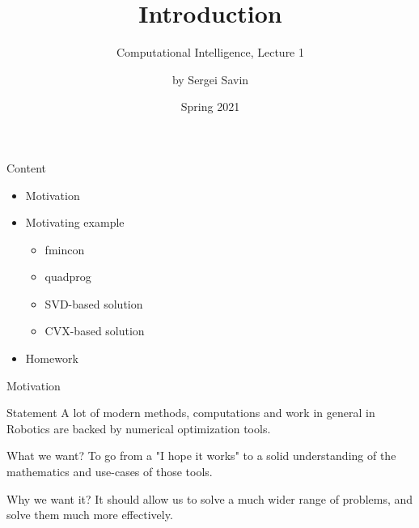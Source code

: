 \documentclass{beamer}
\title{Introduction}
\subtitle{Computational Intelligence, Lecture 1}
\author{by Sergei Savin}
\date{Spring 2021}
\begin{document}
\maketitle


\begin{frame}{Content}

\begin{itemize}
\item Motivation
\item Motivating example
\begin{itemize}
\item fmincon
\item quadprog
\item SVD-based solution
\item CVX-based solution
\end{itemize}
\item Homework
\end{itemize}

\end{frame}



\begin{frame}{Motivation}
\begin{flushleft}

\begin{block}{Statement}
  A lot of modern methods, computations and work in general in Robotics are backed by numerical optimization tools.
\end{block}

\begin{block}{What we want?}
  To go from a "I hope it works" to a solid understanding of the mathematics and use-cases of those tools.
\end{block}

\begin{block}{Why we want it?}
  It should allow us to solve a much wider range of problems, and solve them much more effectively.
\end{block}

\end{flushleft}
\end{frame}
\end{document}
